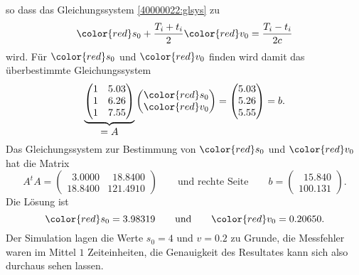 \begin{loesung}
\[\]
so dass das Gleichungssystem \eqref{40000022:glsys}
zu 
\begin{equation}
{\color{red}s_0} + \frac{T_i+t_i}{2} {\color{red}v_0}
=
\frac{T_i-t_i}{2c}
\label{40000022:glsys2}
\end{equation}
wird.
Für 
$\color{red}s_0$
und
$\color{red}v_0$
finden wird damit das überbestimmte Gleichungssystem
\[
\underbrace{
\begin{pmatrix}
1&5.03\\
1&6.26\\
1&7.55
\end{pmatrix}
}_{\displaystyle=A}
\begin{pmatrix}
\color{red}s_0\\
\color{red}v_0
\end{pmatrix}
=
\begin{pmatrix}
5.03\\
5.26\\
5.55
\end{pmatrix}
=
b.
\]
Das Gleichungssystem zur Bestimmung von $\color{red}s_0$ und $\color{red}v_0$
hat die Matrix
\[
A^tA
=
\begin{pmatrix}
\phantom{0}3.0000&\phantom{0}18.8400\\
          18.8400&          121.4910
\end{pmatrix}
\qquad
\text{und rechte Seite}
\qquad
b
=
\begin{pmatrix}
   \phantom{0}15.840\\
             100.131
\end{pmatrix}.
\]
Die Lösung ist
\[
{\color{red}s_0} =    3.98319
\qquad\text{und}\qquad
{\color{red}v_0} =   0.20650.
\]
Der Simulation lagen die Werte $s_0=4$ und $v=0.2$ zu Grunde, die Messfehler
waren im Mittel $1$ Zeiteinheiten, die Genauigkeit des Resultates kann sich
also durchaus sehen lassen.
\end{loesung}

